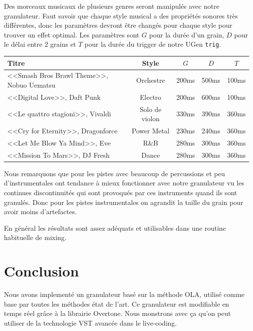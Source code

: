 \documentclass[letterpaper]{article}
\begin{document}
  Des morceaux musicaux de plusieurs genres seront manipulés avec notre granulateur. Faut savoir que
  chaque style musical a des propriétés sonores très différentes, donc les paramètres devront
  être changés pour chaque style pour trouver un effet optimal. Les paramètres sont $G$ pour la durée
  d'un grain, $D$ pour le délai entre 2 grains et $T$ pour la durée du trigger de notre UGen \verb+trig+.

  \begin{center}
    \begin{tabular}{ | m{2cm} | c | c | c | c |}
      \hline
      Titre & Style & $G$ & $D$ & $T$ \\
      \hline
      <<Smash Bros Brawl Theme>>, Nobuo Uematsu & Orchestre & 200ms & 500ms & 100ms \\
      \hline
      <<Digital Love>>, Daft Punk & Electro & 200ms & 600ms & 100ms \\
      \hline
      <<Le quattro stagioni>>, Vivaldi & Solo de violon & 330ms & 390ms & 360ms \\
      \hline
      <<Cry for Eternity>>, Dragonforce & Power Metal & 230ms & 240ms & 360ms \\
      \hline
      <<Let Me Blow Ya Mind>>, Eve  & R\&B & 280ms & 300ms & 360ms \\
      \hline
      <<Mission To Mars>>, DJ Fresh  & Dance & 280ms & 300ms & 360ms \\
      \hline
    \end{tabular}
  \end{center}
  
  Nous remarquons que pour les pistes avec beaucoup de percussions et peu d'instrumentales ont
  tendance à mieux fonctionner avec notre granulateur vu les continues discontinuités qui sont
  provoqués par ces instruments quand ils sont granulés.
  Donc pour les pistes instrumentales on agrandit la taille du grain pour avoir moins d'artefactes.

  En général les résultats sont assez adéquats et utilisables dans une routine habituelle de mixing.
    
  \section{Conclusion}

  Nous avons implementé un granulateur basé sur la méthode OLA, utilisé comme base par toutes les méthodes
  état de l'art. Ce granulateur est modifiable en temps réel grâce à la librairie Overtone. Nous monstrons
  avec ça qu'on peut utiliser de la technologie VST avancée dans le live-coding.
\end{document}
